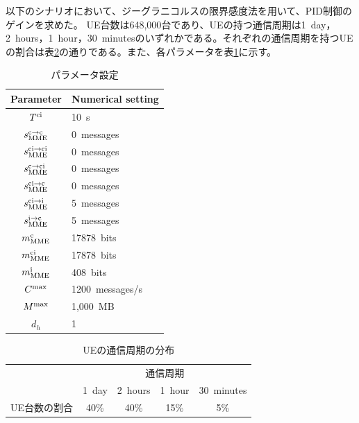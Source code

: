 \documentclass[a4j]{ujarticle}
\begin{document}
以下のシナリオにおいて、ジーグラニコルスの限界感度法を用いて、PID制御のゲインを求めた。
UE台数は648,000台であり、UEの持つ通信周期は1~day，2~hours，1~hour，30~minutesのいずれかである。それぞれの通信周期を持つUEの割合は表\ref{table:interval}の通りである。また、各パラメータを表\ref{table:parameter}に示す。
\begin{table}[htbp]
  \centering
  \caption{パラメータ設定}
  \label{table:parameter}
  \begin{tabular}{c|l}
    \hline
    Parameter  & Numerical setting \\\hline \hline
    $T^{\rm ci}$ & 10~s\\
    $s_{\rm MME}^{\rm c \to \rm c}$ & 0~messages\\
    $s_{\rm MME}^{\rm ci \to \rm ci}$ & 0~messages\\
    $s_{\rm MME}^{\rm c \to \rm ci}$ & 0~messages\\
    $s_{\rm MME}^{\rm ci \to \rm c}$ & 0~messages\\
    $s_{\rm MME}^{\rm ci \to \rm i}$ & 5~messages\\
    $s_{\rm MME}^{\rm i \to \rm c}$ & 5~messages\\
    $m^{\rm c}_{\rm MME}$ & 17878~bits\\
    $m^{\rm ci}_{\rm MME}$ & 17878~bits\\
    $m^{\rm i}_{\rm MME}$ & 408~bits\\
    $C^{\rm max}$ & 1200~messages/s\\
    $M^{\rm max}$ & 1,000~MB\\
    $d_h$ & 1 \\\hline
  \end{tabular}
\end{table}
\begin{table}[htbp]
  \centering
  \caption{UEの通信周期の分布}
  \label{table:interval}
  \begin{tabular}{c|cccc}
    \hline
    &\multicolumn{4}{c}{通信周期} \\
    & 1~day & 2~hours & 1~hour & 30~minutes \\\hline \hline
    UE台数の割合 & 40\% & 40\% & 15\% & 5\% \\\hline
  \end{tabular}
\end{table}
\end{document}
